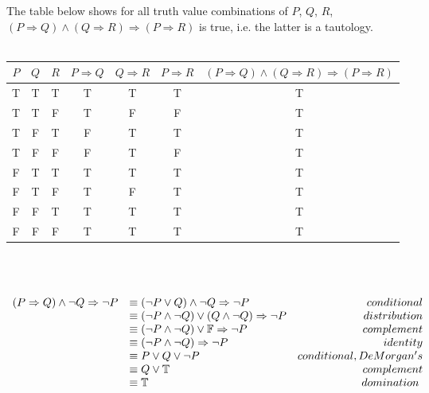 \documentclass[a4paper, 11pt]{article}
\begin{document}
\begin{myEnumerate}
	\item
	\begin{myEnumerate}
    	\item The table below shows for all truth value combinations of $P$, $Q$, $R$,\\ $(P\Rightarrow Q)\land (Q\Rightarrow R)\Rightarrow (P\Rightarrow R)$ is true, i.e. the latter is a tautology. \\ \\
    	\begin{tabular}{|c|c|c|c|c|c|c|}
        	\hline
            $P$ & $Q$ & $R$ & $P\Rightarrow Q$ & $Q\Rightarrow R$ & $P\Rightarrow R$ & $(P\Rightarrow Q)\land (Q\Rightarrow R)\Rightarrow (P\Rightarrow R)$ \\
            \hline
            T & T & T & T & T & T & T \\
            T & T & F & T & F & F & T \\
            T & F & T & F & T & T & T \\
            T & F & F & F & T & F & T \\
            F & T & T & T & T & T & T \\
            F & T & F & T & F & T & T \\
            F & F & T & T & T & T & T \\
            F & F & F & T & T & T & T \\
            \hline
    	\end{tabular}
        \\ \\
        \item
        \(
        \\
        \begin{array}{llr}
        	(P\Rightarrow Q) \wedge \neg Q \Rightarrow \neg P & \equiv (\neg P \lor Q) \land \neg Q \Rightarrow \neg P & conditional \\
            & \equiv (\neg P \land \neg Q) \lor (Q \land \neg Q) \Rightarrow \neg P & distribution \\
            & \equiv (\neg P \land \neg Q) \lor \mathbb{F} \Rightarrow \neg P & complement \\
            & \equiv (\neg P \land \neg Q) \Rightarrow \neg P & identity \\
            & \equiv P \lor Q \lor \neg P & conditional, DeMorgan's \\
            & \equiv Q \lor \mathbb{T} & complement \\
            & \equiv \mathbb{T} & domination \
        \end{array}
        \)
        \\


\end{myEnumerate}
\end{myEnumerate}
\end{document}
